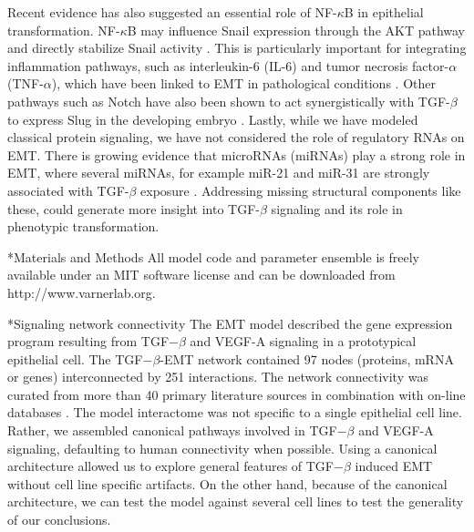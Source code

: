\documentclass[12pt]{article}
\makeatletter
\renewcommand\subsection{\@startsection
	{subsection}{2}{0mm}
	{-0.05in}
	{-0.5\baselineskip}
	{\normalfont\normalsize\bfseries}}
\renewcommand\section{\@startsection
	{subsection}{2}{0mm}
	{-0.2in}
	{0.05\baselineskip}
	{\normalfont\large\bfseries}}
\makeatother
\begin{document}
Recent evidence has also suggested an essential role of NF-$\kappa$B in epithelial transformation.  NF-$\kappa$B may influence Snail expression through the AKT pathway and directly stabilize Snail activity \citep{Wu:2009cr}.  This is particularly important for integrating inflammation pathways, such as interleukin-6 (IL-6) and tumor necrosis factor-$\alpha$ (TNF-$\alpha$), which have been linked to EMT in pathological conditions \citep{Sullivan:2009bh}.
Other pathways such as Notch have also been shown to act synergistically with TGF-$\beta$ to express Slug in the developing embryo \citep{Niessen:2008nx}.
Lastly, while we have modeled classical protein signaling, we have not considered the role of regulatory RNAs on EMT.
There is growing evidence that microRNAs (miRNAs) play a strong role in EMT, where several miRNAs, for example miR-21 and miR-31 are strongly associated with TGF-$\beta$ exposure \citep{Bullock:2012aa}.
Addressing missing structural components like these, could generate more insight into TGF-$\beta$ signaling and its role in phenotypic transformation.

\clearpage

\section*{Materials and Methods}
All model code and parameter ensemble is freely available under an MIT software license and can be downloaded from http://www.varnerlab.org.

\subsection*{Signaling network connectivity}
The EMT model described the gene expression program resulting from TGF$-\beta$ and VEGF-A signaling in a prototypical epithelial cell.
The TGF$-\beta$-EMT network contained 97 nodes (proteins, mRNA or genes) interconnected by 251 interactions.
The network connectivity was curated from more than 40 primary literature sources in combination with on-line databases \citep{Linding:2007fk,Jensen:2009fk}.
The model interactome was not specific to a single epithelial cell line.
Rather, we assembled canonical pathways involved in TGF$-\beta$ and VEGF-A signaling, defaulting to human connectivity when possible.
Using a canonical architecture allowed us to explore general features of TGF$-\beta$ induced EMT without cell line specific artifacts.
On the other hand, because of the canonical architecture, we can test the model against several cell lines to test the generality of our conclusions.
\end{document}
